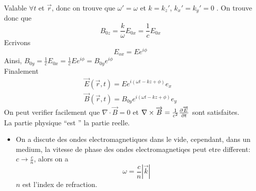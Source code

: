 \documentclass[../main.tex]{subfiles}
\begin{document}
Valable $\forall t $ et $\vec{r}$, donc on trouve que $\omega' = \omega $ et $k = k_z' $, $k_x' = k_y' = 0$ .
On trouve donc que
\[ 
B_{0z} = \frac{k}{\omega}E_{0x}  = \frac{1}{c} E_{0x} 
\]
Ecrivons 
\[ 
E_{ox}  = E e^{i \phi} 
\]
Ainsi, $B_{0y}  = \frac{1}{c }E_{0x} = \frac{1}{c }E e^{i \phi} = B_{0y} e^{i \phi} $\\
Finalement
\begin{align*}
\vec{E}( \vec{r},t) = E e^{i ( \omega t - kz + \phi) } e_x\\
\vec{B}( \vec{r},t) = B_{0y}  e^{i ( \omega t - k z + \phi ) } e_y 
\end{align*}
On peut verifier facilement que $\nabla \cdot \vec{B} = 0$ et $\nabla \times \overrightarrow{B} = \frac{1}{c^{2}} \frac{\partial \overrightarrow{E}}{\partial t}$ sont satisfaites.\\
La partie physique ``est '' la partie reelle.
\begin{rmq}[additionelles]
\begin{itemize}
\item On a discute des ondes electromagnetiques dans le vide, cependant, dans un medium, la vitesse de phase des ondes electromagnetiqes peut etre different: $c \to \frac{c}{n} $, alors on a
	\[ 
	\omega = \frac{c}{n} |\vec{k}|
	\]
	$n$ est l'index de refraction.
\end{itemize}
\end{rmq}





	
\end{document}
